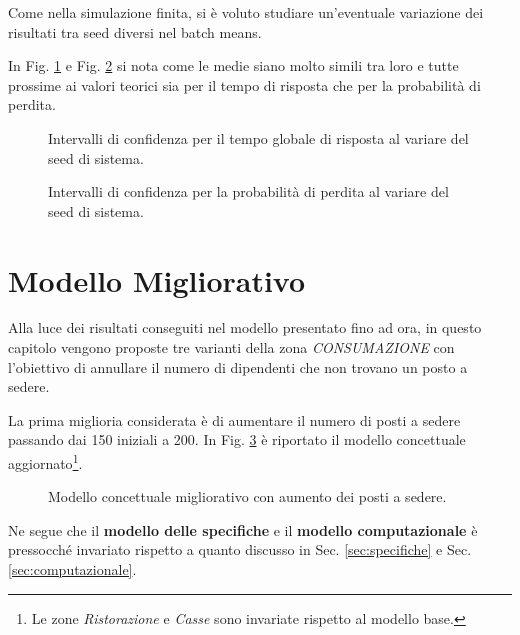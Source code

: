 \documentclass{article}
\begin{document}
Come nella simulazione finita, si è voluto studiare un'eventuale variazione dei risultati tra seed diversi nel batch means. 

In Fig. \ref{fig:grt_seed_infinite} e Fig. \ref{fig:ploss_seed_infinite} si nota come le medie siano molto simili tra loro e tutte prossime ai valori teorici sia per il tempo di risposta che per la probabilità di perdita. 

\begin{figure}[htbp]
  \centering
  
  \caption{Intervalli di confidenza per il tempo globale di risposta al variare del seed di sistema.}
  \label{fig:grt_seed_infinite}
\end{figure}

\begin{figure}[htbp]
  \centering
  
  \caption{Intervalli di confidenza per la probabilità di perdita al variare del seed di sistema.}
  \label{fig:ploss_seed_infinite}
\end{figure}
\FloatBarrier

\section{Modello Migliorativo}

Alla luce dei risultati conseguiti nel modello presentato fino ad ora, in questo capitolo vengono proposte tre varianti della zona \textit{CONSUMAZIONE} con l'obiettivo di annullare il numero di dipendenti che non trovano un posto a sedere.

La prima miglioria considerata è di aumentare il numero di posti a sedere passando dai 150 iniziali a 200. In Fig. \ref{fig:esteso_1_concettuale} è riportato il modello concettuale aggiornato\footnote{Le zone \textit{Ristorazione} e \textit{Casse} sono invariate rispetto al modello base.}.

\begin{figure}[H]
\centering
 
 \caption{Modello concettuale migliorativo con aumento dei posti a sedere.}
  \label{fig:esteso_1_concettuale}
\end{figure}
\FloatBarrier

Ne segue che il \textbf{modello delle specifiche} e il \textbf{modello computazionale} è pressocché invariato rispetto a quanto discusso in Sec. \ref{sec:specifiche} e Sec. \ref{sec:computazionale}.
\end{document}
